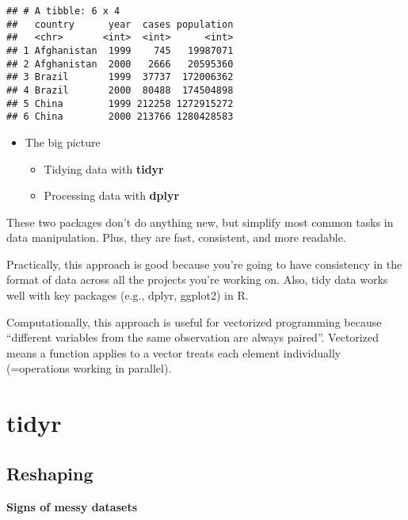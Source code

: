 \documentclass[
]{book}
\providecommand{\tightlist}{%
  \setlength{\itemsep}{0pt}\setlength{\parskip}{0pt}}
\begin{document}
\begin{verbatim}
## # A tibble: 6 x 4
##   country      year  cases population
##   <chr>       <int>  <int>      <int>
## 1 Afghanistan  1999    745   19987071
## 2 Afghanistan  2000   2666   20595360
## 3 Brazil       1999  37737  172006362
## 4 Brazil       2000  80488  174504898
## 5 China        1999 212258 1272915272
## 6 China        2000 213766 1280428583
\end{verbatim}

\begin{itemize}
\tightlist
\item
  The big picture

  \begin{itemize}
  \tightlist
  \item
    Tidying data with \textbf{tidyr}
  \item
    Processing data with \textbf{dplyr}
  \end{itemize}
\end{itemize}

These two packages don't do anything new, but simplify most common tasks in data manipulation. Plus, they are fast, consistent, and more readable.

Practically, this approach is good because you're going to have consistency in the format of data across all the projects you're working on. Also, tidy data works well with key packages (e.g., dplyr, ggplot2) in R.

Computationally, this approach is useful for vectorized programming because ``different variables from the same observation are always paired''. Vectorized means a function applies to a vector treats each element individually (=operations working in parallel).

\hypertarget{tidyr}{%
\section{tidyr}\label{tidyr}}

\hypertarget{reshaping}{%
\subsection{Reshaping}\label{reshaping}}

\textbf{Signs of messy datasets}
\end{document}
